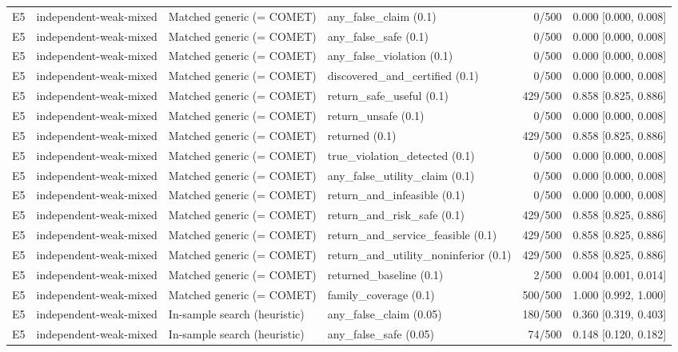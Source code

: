 \begin{longtable}{p{.04\linewidth}p{.18\linewidth}p{.19\linewidth}p{.16\linewidth}r p{.21\linewidth}}
E5 & independent-weak-mixed & Matched generic (= COMET) & any\_false\_claim (0.1) & 0/500 & 0.000 [0.000, 0.008]\\
E5 & independent-weak-mixed & Matched generic (= COMET) & any\_false\_safe (0.1) & 0/500 & 0.000 [0.000, 0.008]\\
E5 & independent-weak-mixed & Matched generic (= COMET) & any\_false\_violation (0.1) & 0/500 & 0.000 [0.000, 0.008]\\
E5 & independent-weak-mixed & Matched generic (= COMET) & discovered\_and\_certified (0.1) & 0/500 & 0.000 [0.000, 0.008]\\
E5 & independent-weak-mixed & Matched generic (= COMET) & return\_safe\_useful (0.1) & 429/500 & 0.858 [0.825, 0.886]\\
E5 & independent-weak-mixed & Matched generic (= COMET) & return\_unsafe (0.1) & 0/500 & 0.000 [0.000, 0.008]\\
E5 & independent-weak-mixed & Matched generic (= COMET) & returned (0.1) & 429/500 & 0.858 [0.825, 0.886]\\
E5 & independent-weak-mixed & Matched generic (= COMET) & true\_violation\_detected (0.1) & 0/500 & 0.000 [0.000, 0.008]\\
E5 & independent-weak-mixed & Matched generic (= COMET) & any\_false\_utility\_claim (0.1) & 0/500 & 0.000 [0.000, 0.008]\\
E5 & independent-weak-mixed & Matched generic (= COMET) & return\_and\_infeasible (0.1) & 0/500 & 0.000 [0.000, 0.008]\\
E5 & independent-weak-mixed & Matched generic (= COMET) & return\_and\_risk\_safe (0.1) & 429/500 & 0.858 [0.825, 0.886]\\
E5 & independent-weak-mixed & Matched generic (= COMET) & return\_and\_service\_feasible (0.1) & 429/500 & 0.858 [0.825, 0.886]\\
E5 & independent-weak-mixed & Matched generic (= COMET) & return\_and\_utility\_noninferior (0.1) & 429/500 & 0.858 [0.825, 0.886]\\
E5 & independent-weak-mixed & Matched generic (= COMET) & returned\_baseline (0.1) & 2/500 & 0.004 [0.001, 0.014]\\
E5 & independent-weak-mixed & Matched generic (= COMET) & family\_coverage (0.1) & 500/500 & 1.000 [0.992, 1.000]\\
E5 & independent-weak-mixed & In-sample search (heuristic) & any\_false\_claim (0.05) & 180/500 & 0.360 [0.319, 0.403]\\
E5 & independent-weak-mixed & In-sample search (heuristic) & any\_false\_safe (0.05) & 74/500 & 0.148 [0.120, 0.182]\\

\end{longtable}
